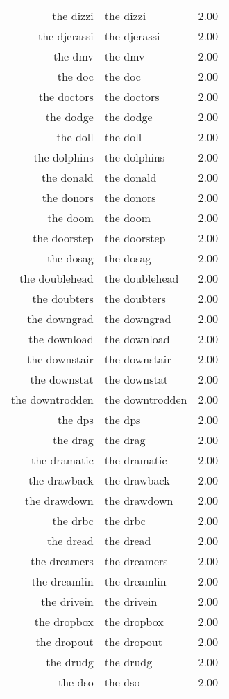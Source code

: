 \begin{table}[ht]
\begin{tabular}{rlr}
  the dizzi & the dizzi & 2.00 \\ 
  the djerassi & the djerassi & 2.00 \\ 
  the dmv & the dmv & 2.00 \\ 
  the doc & the doc & 2.00 \\ 
  the doctors & the doctors & 2.00 \\ 
  the dodge & the dodge & 2.00 \\ 
  the doll & the doll & 2.00 \\ 
  the dolphins & the dolphins & 2.00 \\ 
  the donald & the donald & 2.00 \\ 
  the donors & the donors & 2.00 \\ 
  the doom & the doom & 2.00 \\ 
  the doorstep & the doorstep & 2.00 \\ 
  the dosag & the dosag & 2.00 \\ 
  the doublehead & the doublehead & 2.00 \\ 
  the doubters & the doubters & 2.00 \\ 
  the downgrad & the downgrad & 2.00 \\ 
  the download & the download & 2.00 \\ 
  the downstair & the downstair & 2.00 \\ 
  the downstat & the downstat & 2.00 \\ 
  the downtrodden & the downtrodden & 2.00 \\ 
  the dps & the dps & 2.00 \\ 
  the drag & the drag & 2.00 \\ 
  the dramatic & the dramatic & 2.00 \\ 
  the drawback & the drawback & 2.00 \\ 
  the drawdown & the drawdown & 2.00 \\ 
  the drbc & the drbc & 2.00 \\ 
  the dread & the dread & 2.00 \\ 
  the dreamers & the dreamers & 2.00 \\ 
  the dreamlin & the dreamlin & 2.00 \\ 
  the drivein & the drivein & 2.00 \\ 
  the dropbox & the dropbox & 2.00 \\ 
  the dropout & the dropout & 2.00 \\ 
  the drudg & the drudg & 2.00 \\ 
  the dso & the dso & 2.00 \\ 

\end{tabular}
\end{table}

